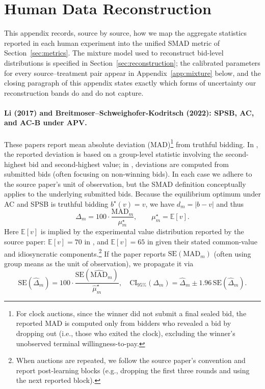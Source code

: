 \section{Human Data Reconstruction}\label{app:human}

This appendix records, source by source, how we map the aggregate statistics reported in each human experiment into the unified SMAD metric of Section~\ref{sec:metrics}. The mixture model used to reconstruct bid-level distributions is specified in Section~\ref{sec:reconstruction}; the calibrated parameters for every source--treatment pair appear in Appendix~\ref{app:mixture} below, and the closing paragraph of this appendix states exactly which forms of uncertainty our reconstruction bands do and do not capture.

\paragraph{Li (2017) and Breitmoser--Schweighofer-Kodritsch (2022): SPSB, AC, and AC-B under APV.}
These papers \citep{li2017obviously,breitmoser2022obviousness} report mean absolute deviation (MAD)\footnote{For clock auctions, since the winner did not submit a final sealed bid, the reported MAD is computed only from bidders who revealed a bid by dropping out (i.e., those who exited the clock), excluding the winner's unobserved terminal willingness-to-pay.}
from truthful bidding. In \citet{li2017obviously}, the reported deviation is based on a group-level statistic involving the second-highest bid and second-highest value; in \citet{breitmoser2022obviousness}, deviations are computed from submitted bids (often focusing on non-winning bids). In each case we adhere to the source paper's unit of observation, but the SMAD definition conceptually applies to the underlying submitted bids.
Because the equilibrium optimum under AC and SPSB is truthful bidding $b^\star(v)=v$, we have $d_m=|b-v|$ and thus
\[
\Delta_m = 100\cdot \frac{\mathrm{MAD}_m}{\mu_m^\star},
\qquad
\mu_m^\star=\mathbb E[v].
\]
Here $\mathbb E[v]$ is implied by the experimental value distribution reported by the source paper: $\mathbb E[v]=70$ in \citet{li2017obviously}, and $\mathbb E[v]=65$ in \citet{breitmoser2022obviousness} given their stated common-value and idiosyncratic components.\footnote{When auctions are repeated, we follow the source paper's convention and report post-learning blocks (e.g., dropping the first three rounds and using the next reported block).}
If the paper reports $\mathrm{SE}(\mathrm{MAD}_m)$ (often using group means as the unit of observation), we propagate it via
\[
\mathrm{SE}(\widehat{\Delta}_m)=100\cdot \frac{\mathrm{SE}(\widehat{\mathrm{MAD}}_m)}{\widehat{\mu}_m^\star},
\quad
\mathrm{CI}_{95\%}(\Delta_m)=\widehat{\Delta}_m \pm 1.96\,\mathrm{SE}(\widehat{\Delta}_m).
\]

